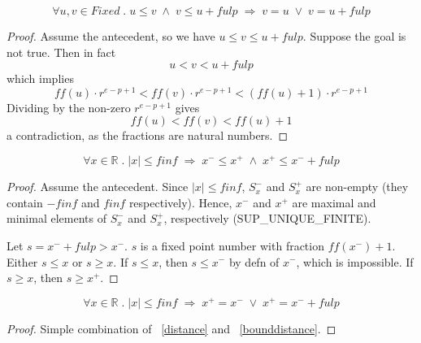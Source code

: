 \documentclass{article}
\begin{document}
\begin{lem}
\label{distance}
\begin{equation*}
\forall u, v \in Fixed \; . \; u \leq v \; \wedge \; v \leq u + fulp \;
\Longrightarrow \; v = u \; \vee \; v = u + fulp
\end{equation*}
\begin{proof} Assume the antecedent, so we have $u \leq v \leq u + fulp$.
Suppose the goal is not true. Then in fact
\begin{equation*}
u < v < u + fulp 
\end{equation*}
which implies
\begin{equation*}
ff(u) \cdot r^{e - p + 1} < ff(v) \cdot r^{e - p + 1} < (ff(u) + 1) \cdot r^{e - p + 1}
\end{equation*}
Dividing by the non-zero $r^{e - p + 1}$ gives
\begin{equation*}
ff(u) < ff(v) < ff(u) + 1
\end{equation*}
a contradiction, as the fractions are natural numbers.
\end{proof}
\end{lem}

\begin{lem}
\label{bounddistance}
\begin{equation*}
\forall x \in \mathbb{R} \; . \; |x| \leq finf \;
\Longrightarrow \; x^- \leq x^+ \; \wedge \; x^+ \leq x^- + fulp
\end{equation*}
\begin{proof} Assume the antecedent. Since $|x| \leq finf$, $S_x^-$ and
$S_x^+$ are non-empty (they contain $-finf$ and $finf$ respectively).
Hence, $x^-$ and $x^+$ are maximal and minimal elements of $S_x^-$ and
$S_x^+$, respectively (SUP\_UNIQUE\_FINITE).

Let $s = x^- + fulp > x^-$. $s$ is a fixed point number with fraction
$ff(x^-) + 1$. Either $s \leq x$ or $s \geq x$. If $s \leq x$, then
$s \leq x^-$ by defn of $x^-$, which is impossible. If $s \geq x$, then
$s \geq x^+$.
\end{proof}
\end{lem}

\begin{lem}
\label{bounddistance2}
\begin{equation*}
\forall x \in \mathbb{R} \; . \; |x| \leq finf \;
\Longrightarrow \; x^+ = x^- \; \vee \; x^+ = x^- + fulp
\end{equation*}
\begin{proof} Simple combination of ~\ref{distance} and ~\ref{bounddistance}.
\end{proof}
\end{lem}
\end{document}
